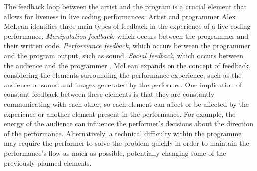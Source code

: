 \documentclass[12pt, twoside, a4paper]{report}
\begin{document}

The feedback loop between the artist and the program is a crucial element that allows for liveness in live coding performances. Artist and programmer  Alex McLean identifies three main types of feedback in the experience of a live coding performance. \textit{Manipulation feedback},
 which occurs between the programmer and their written code. \textit{Performance feedback}, which occurs between the 
 programmer and the program output, such as sound. \textit{Social feedback}, which occurs between the audience and the programmer \citep{mclean2011artist}. McLean expands on the concept of feedback, considering the elements surrounding the performance experience, such as the audience or sound and images generated by the performer. One implication of constant feedback between these elements is that they are constantly communicating with each other, so each element can affect or be affected by the experience or another element present in the performance. For example, the energy of the audience can influence the performer's decisions about the direction of the performance. Alternatively, a technical difficulty within the programme may require the performer to solve the problem quickly in order to maintain the performance's flow as much as possible, potentially changing some of the previously planned elements.

\end{document}
